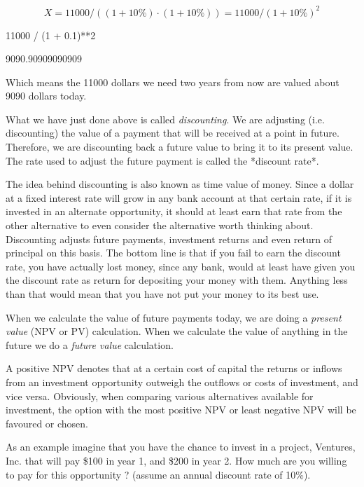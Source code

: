\begin{equation*}
	X = 11000 / \left((1 + 10\%) \cdot (1 + 10\%)\right) =  11000/(1+10\%)^ 2
\end{equation*}

\begin{ipython}
11000 / (1 + 0.1)**2
\end{ipython}
\begin{ioutput}
9090.90909090909
\end{ioutput}

Which means the 11000 dollars we need two years from now are valued about 9090 dollars today.

What we have just done above is called \emph{discounting}. We are adjusting (i.e. discounting) the value of a payment that will be received at a point in future. Therefore, we are discounting back a future value to bring it to its present value. The rate used to adjust the future payment is called the *discount rate*.

The idea behind discounting is also known as time value of money. Since a dollar at a fixed interest rate will grow in any bank account at that certain rate, if it is invested in an alternate opportunity, it should at least earn that rate from the other alternative to even consider the alternative worth thinking about. Discounting adjusts future payments, investment returns and even return of principal on this basis. The bottom line is that if you fail to earn the discount rate, you have actually lost money, since any bank, would at least have given you the discount rate as return for depositing your money with them. Anything less than that would mean that you have not put your money to its best use.

When we calculate the value of future payments today, we are doing a \emph{present value} (NPV or PV) calculation. When we calculate the value of anything in the future we do a \emph{future value} calculation.

A positive NPV denotes that at a certain cost of capital the returns or inflows from an investment opportunity outweigh the outflows or costs of investment, and vice versa. Obviously, when comparing various alternatives available for investment, the option with the most positive NPV or least negative NPV will be favoured or chosen. 

As an example imagine that you have the chance to invest in a project, Ventures, Inc. that will pay \$100 in year 1, and \$200 in year 2. How much are you willing to pay for this opportunity ? (assume an annual discount rate of 10\%).

